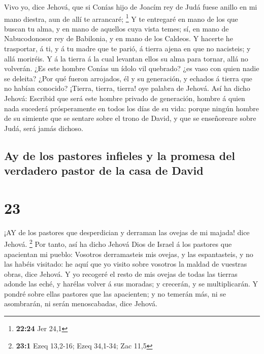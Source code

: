  Vivo yo, dice Jehová, que si Conías hijo de Joacím rey de
Judá fuese anillo en mi mano diestra, aun de allí te arrancaré;
\footnote{\textbf{22:24} Jer 24,1}  Y te entregaré en mano
de los que buscan tu alma, y en mano de aquellos cuya vista temes; sí,
en mano de Nabucodonosor rey de Babilonia, y en mano de los Caldeos.
 Y hacerte he trasportar, á ti, y á tu madre que te parió,
á tierra ajena en que no nacisteis; y allá moriréis.  Y á
la tierra á la cual levantan ellos su alma para tornar, allá no
volverán.  ¿Es este hombre Conías un ídolo vil quebrado?
¿es vaso con quien nadie se deleita? ¿Por qué fueron arrojados, él y su
generación, y echados á tierra que no habían conocido? 
¡Tierra, tierra, tierra! oye palabra de Jehová.  Así ha
dicho Jehová: Escribid que será este hombre privado de generación,
hombre á quien nada sucederá prósperamente en todos los días de su vida:
porque ningún hombre de su simiente que se sentare sobre el trono de
David, y que se enseñoreare sobre Judá, será jamás dichoso.

\hypertarget{ay-de-los-pastores-infieles-y-la-promesa-del-verdadero-pastor-de-la-casa-de-david}{%
\subsection{Ay de los pastores infieles y la promesa del verdadero
pastor de la casa de
David}\label{ay-de-los-pastores-infieles-y-la-promesa-del-verdadero-pastor-de-la-casa-de-david}}

\hypertarget{section-22}{%
\section{23}\label{section-22}}

 ¡AY de los pastores que desperdician y derraman las ovejas
de mi majada! dice Jehová. \footnote{\textbf{23:1} Ezeq 13,2-16; Ezeq
  34,1-34; Zac 11,5}  Por tanto, así ha dicho Jehová Dios de
Israel á los pastores que apacientan mi pueblo: Vosotros derramasteis
mis ovejas, y las espantasteis, y no las habéis visitado: he aquí que yo
visito sobre vosotros la maldad de vuestras obras, dice Jehová.
 Y yo recogeré el resto de mis ovejas de todas las tierras
adonde las eché, y harélas volver á sus moradas; y crecerán, y se
multiplicarán.  Y pondré sobre ellas pastores que las
apacienten; y no temerán más, ni se asombrarán, ni serán menoscabadas,
dice Jehová.

